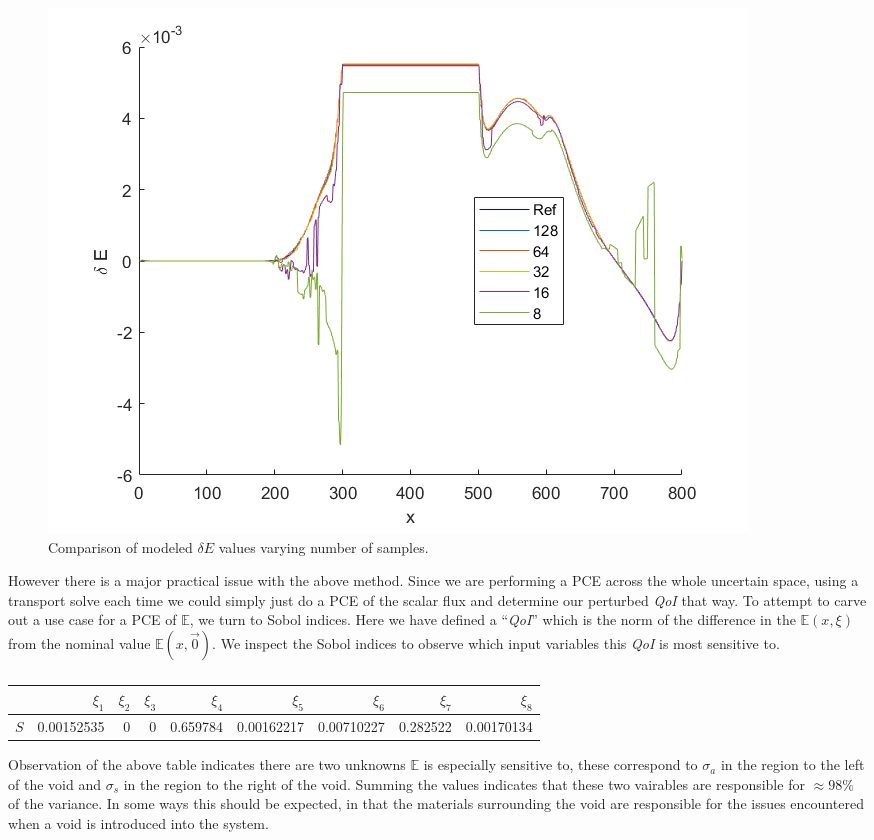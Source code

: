 \documentclass{article}
\newcommand{\Edd}{\mathbb{E}}
\newcommand{\sigs}{\sigma_s}
\newcommand{\siga}{\sigma_a}
\newcommand{\qoi}{{\it QoI}\xspace}
\begin{document}
\begin{figure}[H]
\centering
  \includegraphics[width=0.8 \linewidth]{E8_nsamples.png}
  \caption{Comparison of modeled $\delta E$ values varying number of samples.}
\label{fig:phi_reed}
\end{figure} 


However there is a major practical issue with the above method. Since we are performing a PCE across the whole uncertain space, using a transport solve each time we could simply just do a PCE of the scalar flux and determine our perturbed \qoi that way. To attempt to carve out a use case for a PCE of $\Edd$, we turn to Sobol indices. Here we have defined a ``\qoi'' which is the norm of the difference in the $\Edd(x,\xi)$ from the nominal value $\Edd(x,\vec{0})$. We inspect the Sobol indices to observe which input variables this \qoi is most sensitive to.
\begin{table}[H]
\footnotesize
\centering
  \begin{tabular}{| l | r | r | r | r | r | r | r | r |}
    \hline
  & $\xi_1$ & $\xi_2$ & $\xi_3$ & $\xi_4$ & $\xi_5$ & $\xi_6$ & $\xi_7$ & $\xi_8$ \\ \hline
$S$ & 0.00152535 & 0 & 0 & 0.659784 & 0.00162217 & 0.00710227 & 0.282522 & 0.00170134 \\  \hline
    \end{tabular}
  \caption{}
\end{table}
Observation of the above table indicates there are two unknowns $\Edd$ is especially sensitive to, these correspond to $\siga$ in the region to the left of the void and $\sigs$ in the region to the right of the void. Summing the values indicates that these two vairables are responsible for $\approx 98 \%$ of the variance. In some ways this should be expected, in that the materials surrounding the void are responsible for the issues encountered when a void is introduced into the system.
\end{document}
